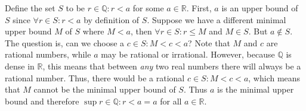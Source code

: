 \documentclass{homework}
\begin{document}
\question
Define the set $S$ to be ${r \in \mathbb{Q}: r < a}$ for some $a \in \mathbb{R}$. First, $a$ is an upper bound of $S$ since $\forall r \in S: r < a$ by definition of $S$. Suppose we have a different minimal upper bound $M$ of $S$ where $M < a$, then $\forall r \in S: r \leq M$ and $M \in S$. But $a \notin S$. The question is, can we choose a $c \in S: M < c < a$? Note that $M$ and $c$ are rational numbers, while $a$ may be rational or irrational. However, because $\mathbb{Q}$ is dense in $\mathbb{R}$, this means that between \textit{any} two real numbers there will always be a rational number. Thus, there would be a rational $c \in S: M < c < a$, which means that $M$ cannot be the minimal upper bound of $S$. Thus $a$ is the minimal upper bound and therefore $\sup{r \in \mathbb{Q} : r < a} = a$ for all $a \in \mathbb{R}$.
\end{document}
